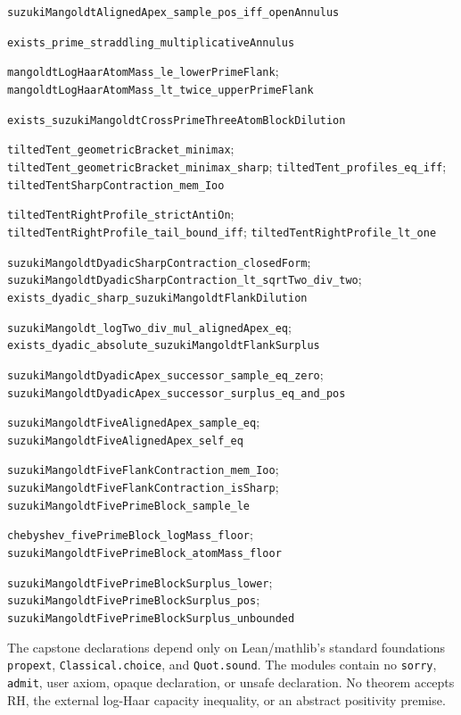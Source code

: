 \documentclass[11pt]{article}
\begin{document}
\begin{sloppypar}
\raggedright
\begin{description}
\small
\item[Theorem~\ref{thm:support}.]
\nolinkurl{suzukiMangoldtAlignedApex_sample_pos_iff_openAnnulus}
\item[Lemma~\ref{lem:flanks}.]
\nolinkurl{exists_prime_straddling_multiplicativeAnnulus}
\item[Theorem~\ref{thm:mass}.]
\nolinkurl{mangoldtLogHaarAtomMass_le_lowerPrimeFlank};
\nolinkurl{mangoldtLogHaarAtomMass_lt_twice_upperPrimeFlank}
\item[Corollary~\ref{cor:primeblock}.]
\nolinkurl{exists_suzukiMangoldtCrossPrimeThreeAtomBlockDilution}
\item[Theorem~\ref{thm:minimax}.]
\nolinkurl{tiltedTent_geometricBracket_minimax};
\nolinkurl{tiltedTent_geometricBracket_minimax_sharp};
\nolinkurl{tiltedTent_profiles_eq_iff};
\nolinkurl{tiltedTentSharpContraction_mem_Ioo}
\item[Theorem~\ref{thm:tail}.]
\nolinkurl{tiltedTentRightProfile_strictAntiOn};
\nolinkurl{tiltedTentRightProfile_tail_bound_iff};
\nolinkurl{tiltedTentRightProfile_lt_one}
\item[Theorem~\ref{thm:contraction}.]
\nolinkurl{suzukiMangoldtDyadicSharpContraction_closedForm};
\nolinkurl{suzukiMangoldtDyadicSharpContraction_lt_sqrtTwo_div_two};
\nolinkurl{exists_dyadic_sharp_suzukiMangoldtFlankDilution}
\item[Theorem~\ref{thm:surplus}.]
\nolinkurl{suzukiMangoldt_logTwo_div_mul_alignedApex_eq};
\nolinkurl{exists_dyadic_absolute_suzukiMangoldtFlankSurplus}
\item[Theorem~\ref{thm:boundary}.]
\nolinkurl{suzukiMangoldtDyadicApex_successor_sample_eq_zero};
\nolinkurl{suzukiMangoldtDyadicApex_successor_surplus_eq_and_pos}
\item[Lemma~\ref{lem:fivesample}.]
\nolinkurl{suzukiMangoldtFiveAlignedApex_sample_eq};
\nolinkurl{suzukiMangoldtFiveAlignedApex_self_eq}
\item[Theorem~\ref{thm:fivecontraction}.]
\nolinkurl{suzukiMangoldtFiveFlankContraction_mem_Ioo};
\nolinkurl{suzukiMangoldtFiveFlankContraction_isSharp};
\nolinkurl{suzukiMangoldtFivePrimeBlock_sample_le}
\item[Lemma~\ref{lem:massfloor}.]
\nolinkurl{chebyshev_fivePrimeBlock_logMass_floor};
\nolinkurl{suzukiMangoldtFivePrimeBlock_atomMass_floor}
\item[Theorem~\ref{thm:macro}.]
\nolinkurl{suzukiMangoldtFivePrimeBlockSurplus_lower};
\nolinkurl{suzukiMangoldtFivePrimeBlockSurplus_pos};
\nolinkurl{suzukiMangoldtFivePrimeBlockSurplus_unbounded}
\end{description}

The capstone declarations depend only on Lean/mathlib's standard foundations
\texttt{propext}, \texttt{Classical.choice}, and \texttt{Quot.sound}.  The modules contain no
\texttt{sorry}, \texttt{admit}, user axiom, opaque declaration, or unsafe declaration.  No theorem
accepts RH, the external log-Haar capacity inequality, or an abstract positivity premise.
\end{sloppypar}
\end{document}
